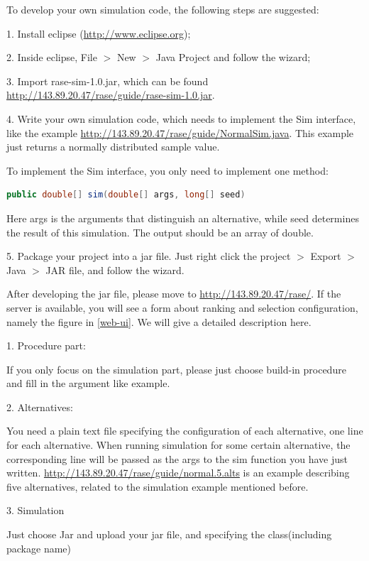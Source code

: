 \documentclass[12pt,a4paper]{report}
\begin{document}
To develop your own simulation code, the following steps are suggested:

1.	Install eclipse (\url{http://www.eclipse.org});

2.	Inside eclipse, File $>$ New $>$ Java Project and follow the wizard;

3.	Import rase-sim-1.0.jar, which can be found \url{http://143.89.20.47/rase/guide/rase-sim-1.0.jar}.

4.	Write your own simulation code, which needs to implement the Sim interface, like the example \url{http://143.89.20.47/rase/guide/NormalSim.java}. This example just returns a normally distributed sample value.

To implement the Sim interface, you only need to implement one method:

\begin{lstlisting}[language=Java]
public double[] sim(double[] args, long[] seed)
\end{lstlisting}

Here args is the arguments that distinguish an alternative, while seed determines the result of this simulation. The output should be an array of double.

5.	Package your project into a jar file. Just right click the project $>$ Export $>$ Java $>$ JAR file, and follow the wizard.

After developing the jar file, please move to \url{http://143.89.20.47/rase/}. If the server is available, you will see a form about ranking and selection configuration, namely the figure in \ref{web-ui}. We will give a detailed description here.

1.	Procedure part:

If you only focus on the simulation part, please just choose build-in procedure and fill in the argument like example.

2.	Alternatives:

You need a plain text file specifying the configuration of each alternative, one line for each alternative. When running simulation for some certain alternative, the corresponding line will be passed as the args to the sim function you have just written. \url{http://143.89.20.47/rase/guide/normal.5.alts} is an example describing five alternatives, related to the simulation example mentioned before.

3.	Simulation

Just choose Jar and upload your jar file, and specifying the class(including package name)
\end{document}
